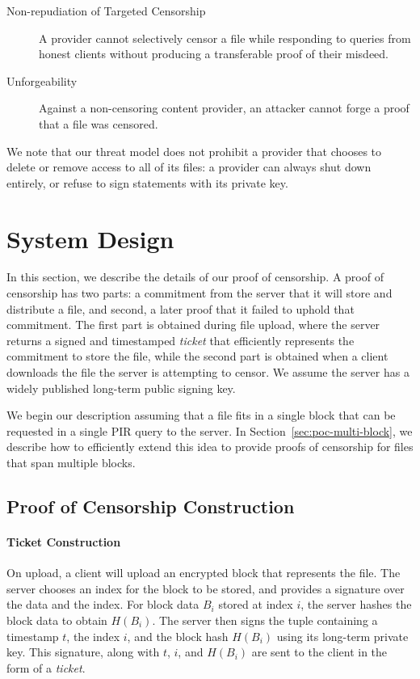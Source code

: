 \begin{description}
	\item[Non-repudiation of Targeted Censorship] A provider cannot
	selectively censor a file while responding to queries from honest clients
    without producing a transferable proof of their misdeed.
	\item[Unforgeability] Against a non-censoring content provider, an attacker
             cannot  forge a proof that a file was  censored.
\end{description}

We note that our threat model does not  prohibit a provider that chooses to delete
or remove access to all of its files: a provider can always shut down entirely,
or refuse to sign statements with its private key.


\section{System Design}

In this section, we describe the details of our proof of censorship. A proof of
censorship has two parts: a commitment from the server that it will store and
distribute a file, and second, a later proof that it failed to uphold that
commitment. The first part is obtained during file upload, where the server
returns a signed and timestamped \emph{ticket} that efficiently represents the
commitment to store the file, while the second part is obtained when a
client downloads the file the server is attempting to censor. We assume the
server has a widely published long-term public signing key.

We begin our description assuming that a file fits in a single block that can be
requested in a single PIR query to the server. In
Section~\ref{sec:poc-multi-block}, we describe how to efficiently extend this idea
to provide proofs of censorship for files that span multiple blocks.

\subsection{Proof of Censorship Construction}\label{ssec:POC-construction}

\FigTicket

\paragraph{Ticket Construction}
On upload, a client will upload an encrypted block that represents
the file. The server chooses an index for the block to be stored, and provides
a signature over the data and the index. For block data $B_i$ stored at index
$i$, the server hashes the block data to obtain $H(B_i)$. The server then signs
the tuple containing a timestamp $t$, the index $i$, and the block hash $H(B_i)$
using its long-term private key. This signature, along with $t$, $i$, and
$H(B_i)$ are sent to the client in the form of a \emph{ticket}.

